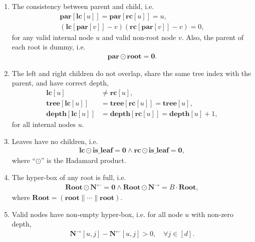 \begin{enumerate}
  \item The consistency between parent and child, i.e.
  \begin{align}
    \mathbf{par}[\mathbf{lc}[u]]=\mathbf{par}[\mathbf{rc}[u]]=u,\\
    (\mathbf{lc}[\mathbf{par}[v]] - v)(\mathbf{rc}[\mathbf{par}[v]] - v) = 0,
  \end{align}
  for any valid internal node $u$ and valid non-root node $v$.
  Also, the parent of each root is dummy, i.e.
  \begin{align}
    \mathbf{par}\odot \mathbf{root} = \mathbf{0}.
  \end{align}

  \item The left and right children do not overlap, share the same tree index with the parent, and have correct depth,
  \begin{align}
    \mathbf{lc}[u] &\neq \mathbf{rc}[u],\\
  \mathbf{tree}[\mathbf{lc}[u]]&=\mathbf{tree}[\mathbf{rc}[u]]=\mathbf{tree}[u],\\
  \mathbf{depth}[\mathbf{lc}[u]]&=\mathbf{depth}[\mathbf{rc}[u]]=\mathbf{depth}[u]+1,
  \end{align}  
  for all internal nodes $u$.

  \item Leaves have no children, i.e. \begin{align}
    \mathbf{lc}\odot \mathbf{is\_leaf}=\mathbf{0}\land \mathbf{rc}\odot \mathbf{is\_leaf}=\mathbf{0},\label{eq:leaf-no-child}
  \end{align}
  where ``$\odot$'' is the Hadamard product.

  \item The hyper-box of any root is full, i.e.
  \begin{align}
    \mathbf{Root}\odot \mathbf{N}^{\leftarrow}=\mathbf{0}\land \mathbf{Root}\odot \mathbf{N}^{\rightarrow}=B\cdot \mathbf{Root},\label{eq:root-full-box}
  \end{align}
  where $\mathbf{Root} = (\mathbf{root}\|\cdots\|\mathbf{root})$.

  \item Valid nodes have non-empty hyper-box, i.e. for all node $u$ with non-zero depth,
    \begin{align}
    \mathbf{N}^{\rightarrow}[u, j] - \mathbf{N}^{\leftarrow}[u, j] > 0, \quad \forall j\in[d].
    \end{align}


\end{enumerate}
